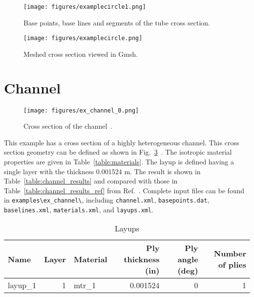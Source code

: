 \documentclass{book}
\begin{document}
\begin{figure}[h]
  \centerline{\texttt{[image: figures/examplecircle1.png]}}
  \caption{Base points, base lines and segments of the tube cross section.}
  \label{fig:tube_1}
\end{figure}

\begin{figure}[h]
  \centerline{\texttt{[image: figures/examplecircle.png]}}
  \caption{Meshed cross section viewed in Gmsh.}
  \label{fig:tube_mesh}
\end{figure}




\clearpage
\section{Channel}
\label{eg:channel}

\begin{figure}[h]
  \centerline{\texttt{[image: figures/ex\_channel\_0.png]}}
  \caption{Cross section of the channel~\cite{chen2010}.}
  \label{fig:channel_0}
\end{figure}

This example has a cross section of a highly heterogeneous channel. 
This cross section geometry can be defined as shown in Fig.~\ref{fig:channel_0}~\cite{chen2010}. 
The isotropic material properties are given in Table~\ref{table:materials}. 
The layup is defined having a single layer with the thickness 0.001524 m. 
The result is shown in Table~\ref{table:channel_results} and compared 
with those in Table~\ref{table:channel_results_ref} from Ref.~.
Complete input files can be found in \verb|examples\ex_channel\|, 
including \verb|channel.xml|, \verb|basepoints.dat|, \verb|baselines.xml|, 
\verb|materials.xml|, and \verb|layups.xml|.

\begin{table}[h]
  \centering
  \caption{Layups}
  \begin{tabular}{lrlrrr}
    \toprule
    Name & Layer & Material & Ply thickness (in) & Ply angle (deg) & Number of plies \\
    \midrule
    layup\_1 & 1 & mtr\_1 & 0.001524 &   0 & 1 \\
    \bottomrule
  \end{tabular}
  \label{table:channel_layups}
\end{table}
\end{document}
